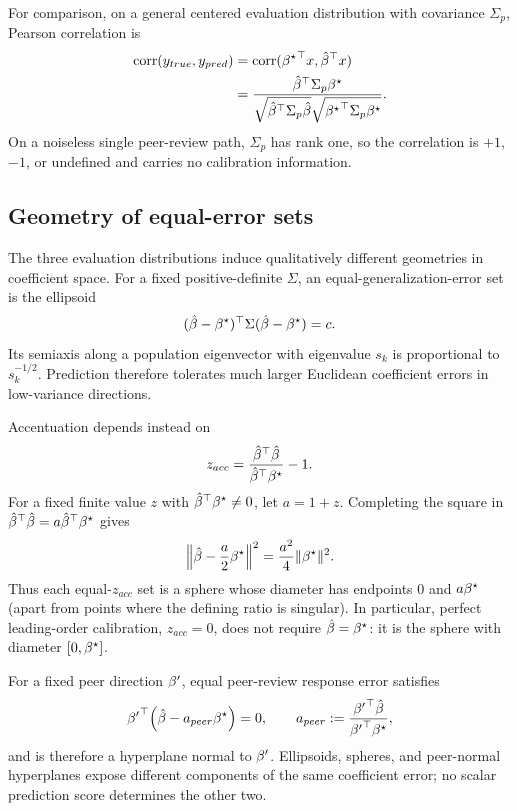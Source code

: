 For comparison, on a general centered evaluation distribution with covariance
$\Sigma_p$, Pearson correlation is
\begin{align*}
\operatorname{corr}(y_{true},y_{pred})
&=\operatorname{corr}({{\beta^{\star}}}^{\top}x,{\hat{\beta}}^{\top}x)\\
&=\frac{{\hat{\beta}}^{\top}\Sigma_p{\beta^{\star}}}
{\sqrt{{\hat{\beta}}^{\top}\Sigma_p\hat{\beta}}\sqrt{{{\beta^{\star}}}^{\top}\Sigma_p{\beta^{\star}}}}.
\end{align*}
On a noiseless single peer-review path, $\Sigma_p$ has rank one, so the
correlation is $+1$, $-1$, or undefined and carries no calibration information.


\begingroup\color{red}
\subsection{Geometry of equal-error sets}
\label{sec:app-iso-error-geometry}

The three evaluation distributions induce qualitatively different
geometries in coefficient space.  For a fixed positive-definite $\Sigma$,
an equal-generalization-error set is the ellipsoid
\begin{equation}
  (\hat{\beta}-{\beta^{\star}})^\top\Sigma(\hat{\beta}-{\beta^{\star}})=c.
  \label{eq:iso-generalization-ellipsoid}
\end{equation}
Its semiaxis along a population eigenvector with eigenvalue $s_k$ is
proportional to $s_k^{-1/2}$.  Prediction therefore tolerates much larger
Euclidean coefficient errors in low-variance directions.

Accentuation depends instead on
\begin{equation}
  z_{acc}=\frac{\hat{\beta}^\top\hat{\beta}}{\hat{\beta}^\top{\beta^{\star}}}-1.
\end{equation}
For a fixed finite value $z$ with $\hat{\beta}^\top{\beta^{\star}}\neq0$, let $a=1+z$.
Completing the square in
$\hat{\beta}^\top\hat{\beta}=a\hat{\beta}^\top{\beta^{\star}}$ gives
\begin{equation}
  \left\|\hat{\beta}-\frac{a}{2}{\beta^{\star}}\right\|^2
  =\frac{a^2}{4}\|{\beta^{\star}}\|^2.
  \label{eq:iso-accentuation-sphere}
\end{equation}
Thus each equal-$z_{acc}$ set is a sphere whose diameter has endpoints
$0$ and $a{\beta^{\star}}$ (apart from points where the defining ratio is singular).
In particular, perfect leading-order calibration, $z_{acc}=0$, does not
require $\hat{\beta}={\beta^{\star}}$: it is the sphere with diameter $[0,{\beta^{\star}}]$.

For a fixed peer direction ${\beta^{\prime}}$, equal peer-review response error
satisfies
\begin{equation}
  {{\beta^{\prime}}}^\top\!\left(\hat{\beta}-a_{peer}{\beta^{\star}}\right)=0,
  \qquad
  a_{peer}:=\frac{{{\beta^{\prime}}}^\top\hat{\beta}}{{{\beta^{\prime}}}^\top{\beta^{\star}}},
  \label{eq:iso-peer-hyperplane}
\end{equation}
and is therefore a hyperplane normal to ${\beta^{\prime}}$.  Ellipsoids, spheres,
and peer-normal hyperplanes expose different components of the same
coefficient error; no scalar prediction score determines the other two.
\endgroup



